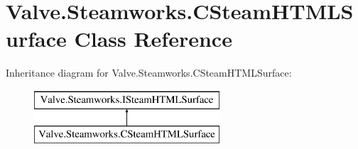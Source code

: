 \hypertarget{classValve_1_1Steamworks_1_1CSteamHTMLSurface}{}\section{Valve.\+Steamworks.\+C\+Steam\+H\+T\+M\+L\+Surface Class Reference}
\label{classValve_1_1Steamworks_1_1CSteamHTMLSurface}
Inheritance diagram for Valve.\+Steamworks.\+C\+Steam\+H\+T\+M\+L\+Surface\+:\begin{figure}[H]
\begin{center}
\leavevmode
\includegraphics[height=2.000000cm]{classValve_1_1Steamworks_1_1CSteamHTMLSurface}
\end{center}
\end{figure}
